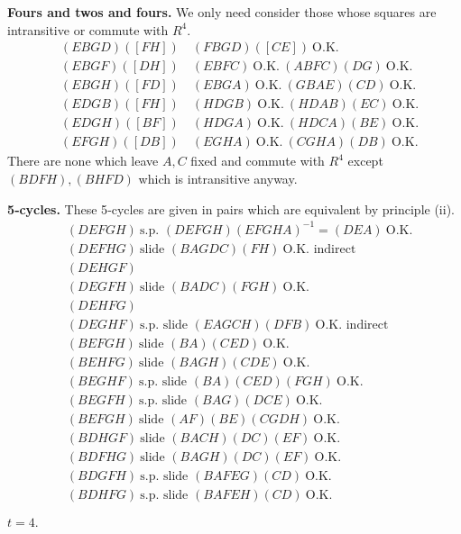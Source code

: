 \documentclass[12pt]{article}
\begin{document}
\noindent
{\bf Fours and twos and fours.}  
We only need consider those whose squares are intransitive or commute with $R^4$.  
\[
\begin{aligned}
&(EBGD)([FH])\quad (FBGD)([CE])\ \text{O.K.}\\
&(EBGF)([DH])\quad (EBFC)\ \text{O.K.}\ (ABFC)(DG)\ \text{O.K.}\\
&(EBGH)([FD])\quad (EBGA)\ \text{O.K.}\ (GBAE)(CD)\ \text{O.K.}\\
&(EDGB)([FH])\quad (HDGB)\ \text{O.K.}\ (HDAB)(EC)\ \text{O.K.}\\
&(EDGH)([BF])\quad (HDGA)\ \text{O.K.}\ (H DCA)(BE)\ \text{O.K.}\\
&(EFGH)([DB])\quad (EGHA)\ \text{O.K.}\ (CGHA)(DB)\ \text{O.K.}
\end{aligned}
\]
There are none which leave $A, C$ fixed and commute with $R^4$ except $(BDFH), (BHFD)$ which is intransitive anyway.

\medskip

\noindent
{\bf 5‐cycles.}
These 5‐cycles are given in pairs which are equivalent by principle (ii).
\[
\begin{aligned}
&(DEFGH)\ \text{s.p. }(DEFGH)(EFGHA)^{-1}=(DEA)\ \text{O.K.}\\
&(DEFHG)\ \text{slide }(BAGDC)(FH)\ \text{O.K.\ indirect}\\
&(DEHGF)\ \\
&(DEGFH)\ \text{slide }(BADC)(FGH)\ \text{O.K.}\\
&(DEHFG)\ \\
&(DEGHF)\ \text{s.p. slide }(EAGCH)(DFB)\ \text{O.K.\ indirect}\\
&(BEFGH)\ \text{slide }(BA)(CED)\ \text{O.K.}\\
&(BEHFG)\ \text{slide }(BAGH)(CDE)\ \text{O.K.}\\
&(BEGHF)\ \text{s.p. slide }(BA)(CED)(FGH)\ \text{O.K.}\\
&(BEGFH)\ \text{s.p. slide }(BAG)(DCE)\ \text{O.K.}\\
&(BEFGH)\ \text{slide }(AF)(BE)(CGDH)\ \text{O.K.}\\
&(BDHGF)\ \text{slide }(BACH)(DC)(EF)\ \text{O.K.}\\
&(BDFHG)\ \text{slide }(BAGH)(DC)(EF)\ \text{O.K.}\\
&(BDGFH)\ \text{s.p. slide }(BAFEG)(CD)\ \text{O.K.}\\
&(BDHFG)\ \text{s.p. slide }(BAFEH)(CD)\ \text{O.K.}
\end{aligned}
\]

\noindent
$t = 4.$
\end{document}
